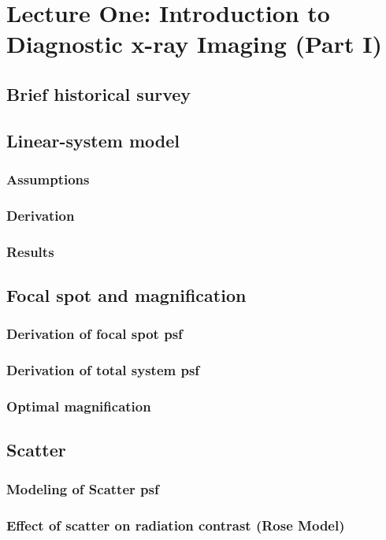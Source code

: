 \documentclass[11pt]{article}
\begin{document}
\tableofcontents

\newpage
\section{Lecture One: Introduction to Diagnostic x-ray Imaging (Part I)}
\subsection{Brief historical survey}
\subsection{Linear-system model}
\subsubsection{Assumptions}
\subsubsection{Derivation}
\subsubsection{Results}
\subsection{Focal spot and magnification}
\subsubsection{Derivation of focal spot psf}
\subsubsection{Derivation of total system psf}
\subsubsection{Optimal magnification}
\subsection{Scatter}
\subsubsection{Modeling of Scatter psf}
\subsubsection{Effect of scatter on radiation contrast (Rose Model)}
\end{document}
